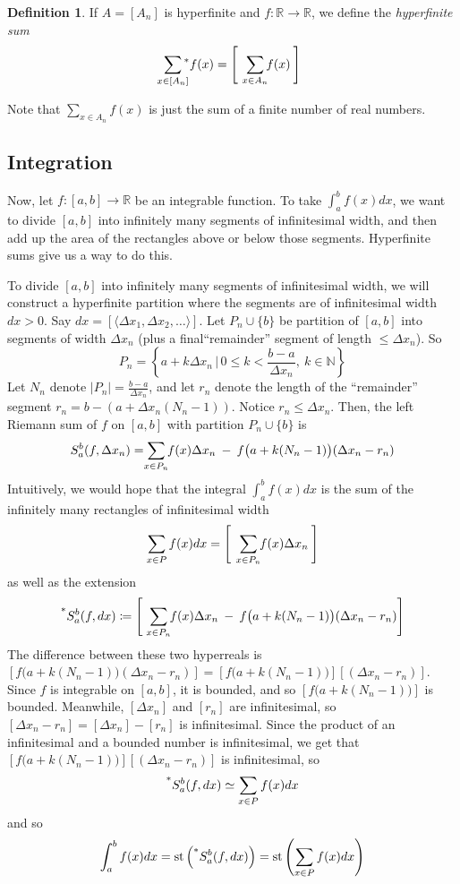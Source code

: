 \documentclass{article}
\newcommand{\sthat}{\,|\,}
\newcommand{\reals}{\mathbb{R}}
\newcommand{\nats}{\mathbb{N}}
\newcommand{\hr}[1]{\prescript{*}{}{#1}}
\DeclareMathOperator{\st}{st}
\theoremstyle{definition}
\newtheorem*{defn}{Definition}
\begin{document}
\begin{defn}
    If $A = [A_n]$ is hyperfinite and $f: \reals \to \reals$, we define the \textit{hyperfinite sum}
    \[\sum_{\mathclap{x \in [A_n]}} \hr{f}(x) = \left[\ \ \sum_{\mathclap{x \in A_n}} f(x) \:\right]\]
\end{defn}

Note that $\sum_{x \in A_n} f(x)$ is just the sum of a finite number of real numbers.

\subsection{Integration}
Now, let $f: [a, b] \to \reals$ be an integrable function. To take $\int_a^b f(x)dx$, we want to divide $[a, b]$ into infinitely many segments of infinitesimal width, and then add up the area of the rectangles above or below those segments. Hyperfinite sums give us a way to do this.

To divide $[a, b]$ into infinitely many segments of infinitesimal width, we will construct a hyperfinite partition where the segments are of infinitesimal width $dx > 0$. Say $dx = [\langle \Delta x_1, \Delta x_2, \ldots \rangle]$. Let $P_n \cup \{b\}$ be partition of $[a, b]$ into segments of width $\Delta x_n$ (plus a final``remainder'' segment of length $\leq \Delta x_n$). So
\[P_n = \left\{a + k\Delta x_n \sthat 0 \leq k < \frac{b-a}{\Delta x_n},\ k \in \nats\right\}\]
Let $N_n$ denote $|P_n| = \frac{b-a}{\Delta x_n}$, and let $r_n$ denote the length of the ``remainder'' segment $r_n = b - (a + \Delta x_n(N_n-1))$. Notice $r_n \leq \Delta x_n$. Then, the left Riemann sum of $f$ on $[a, b]$ with partition $P_n \cup \{b\}$ is 
\[S_a^b (f, \Delta x_n) = \sum_{\mathclap{x \in P_n}} f(x) \Delta x_n \:-\: f\big(a+k(N_n-1)\big)(\Delta x_n - r_n)\]
Intuitively, we would hope that the integral $\int_a^b f(x)dx$ is the sum of the infinitely many rectangles of infinitesimal width 
\[\sum_{x \in P}f(x)dx = \left[\ \ \sum_{\mathclap{x \in P_n}} f(x)\Delta x_n\:\right]\]
as well as the extension 
\[\hr{S_a^b} (f, dx) \coloneq \left[\ \:\sum_{\mathclap{x \in P_n}} f(x) \Delta x_n \:-\: f\big(a+k(N_n-1)\big)(\Delta x_n - r_n)\right]\]
The difference between these two hyperreals is $[f\big(a+k(N_n-1)\big)(\Delta x_n - r_n)] = [f\big(a+k(N_n-1)\big)][(\Delta x_n - r_n)]$. Since $f$ is integrable on $[a, b]$, it is bounded, and so $[f\big(a+k(N_n-1)\big)]$ is bounded. Meanwhile, $[\Delta x_n]$ and $[r_n]$ are infinitesimal, so $[\Delta x_n - r_n] = [\Delta x_n] - [r_n]$ is infinitesimal. Since the product of an infinitesimal and a bounded number is infinitesimal, we get that $[f\big(a+k(N_n-1)\big)][(\Delta x_n - r_n)]$ is infinitesimal, so
\[\hr{S_a^b} (f, dx) \simeq \sum_{x \in P}f(x)dx\]
and so
\[\int_a^b f(x)dx = \st\left(\hr{S_a^b} (f, dx)\right) = \st\left(\sum_{x \in P}f(x)dx\right)\]
\end{document}
